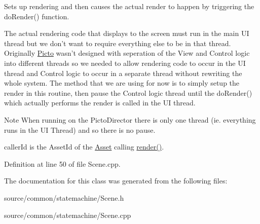 Sets up rendering and then causes the actual render to happen by triggering the do\-Render() function. 

The actual rendering code that displays to the screen must run in the main U\-I thread but we don't want to require everything else to be in that thread. Originally \hyperlink{namespace_picto}{Picto} wasn't designed with seperation of the View and Control logic into different threads so we needed to allow rendering code to occur in the U\-I thread and Control logic to occur in a separate thread without rewriting the whole system. The method that we are using for now is to simply setup the render in this routine, then pause the Control logic thread until the do\-Render() which actually performs the render is called in the U\-I thread. \begin{DoxyNote}{Note}
When running on the Picto\-Director there is only one thread (ie. everything runs in the U\-I Thread) and so there is no pause.
\end{DoxyNote}
caller\-Id is the Asset\-Id of the \hyperlink{class_picto_1_1_asset}{Asset} calling \hyperlink{class_picto_1_1_scene_aaf9d9efc4da11b8596628a102b152de9}{render()}. 

Definition at line 50 of file Scene.\-cpp.



The documentation for this class was generated from the following files\-:\begin{DoxyCompactItemize}
\item 
source/common/statemachine/Scene.\-h\item 
source/common/statemachine/Scene.\-cpp\end{DoxyCompactItemize}
